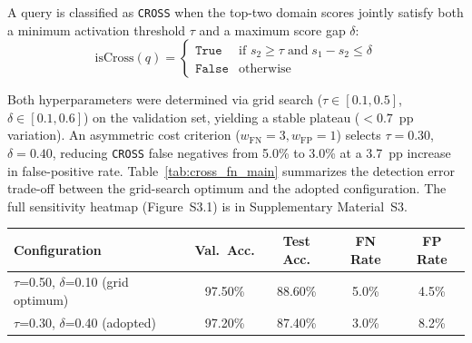 \documentclass[a4paper,fleql,doubleblind]{cas-sc}
\begin{document}
A query is classified as \texttt{CROSS} when the top-two domain scores
jointly satisfy both a minimum activation threshold $\tau$ and a maximum
score gap $\delta$:
\begin{equation}
    \text{isCross}(q) =
    \begin{cases}
        \texttt{True}  & \text{if } s_2 \geq \tau \;\text{and}\;
                         s_1 - s_2 \leq \delta \\
        \texttt{False} & \text{otherwise}
    \end{cases}
    \label{eq:cross_detect}
\end{equation}

Both hyperparameters were determined via grid search
($\tau \in [0.1, 0.5]$, $\delta \in [0.1, 0.6]$) on the validation set,
yielding a stable plateau ($<0.7$~pp variation). An asymmetric cost
criterion ($w_{\text{FN}}=3, w_{\text{FP}}=1$) selects
$\tau = 0.30$, $\delta = 0.40$, reducing \texttt{CROSS} false negatives
from 5.0\% to 3.0\% at a 3.7~pp increase in false-positive rate.
Table~\ref{tab:cross_fn_main} summarizes the detection error trade-off between
the grid-search optimum and the adopted configuration. The full sensitivity
heatmap (Figure~S3.1) is in Supplementary Material~S3.

\vspace{4pt}
\begin{center}
\begingroup
\renewcommand{\arraystretch}{1.2}
\label{tab:cross_fn_main}
\begin{tabular}{lcccc}
\toprule
\textbf{Configuration} & \textbf{Val.\ Acc.} & \textbf{Test Acc.} & \textbf{FN Rate} & \textbf{FP Rate} \\
\midrule
$\tau$=0.50, $\delta$=0.10 (grid optimum) & 97.50\% & 88.60\% & 5.0\% & 4.5\% \\
$\tau$=0.30, $\delta$=0.40 (adopted)      & 97.20\% & 87.40\% & 3.0\% & 8.2\% \\
\bottomrule
\end{tabular}
\endgroup
\end{center}
\vspace{4pt}
\end{document}

